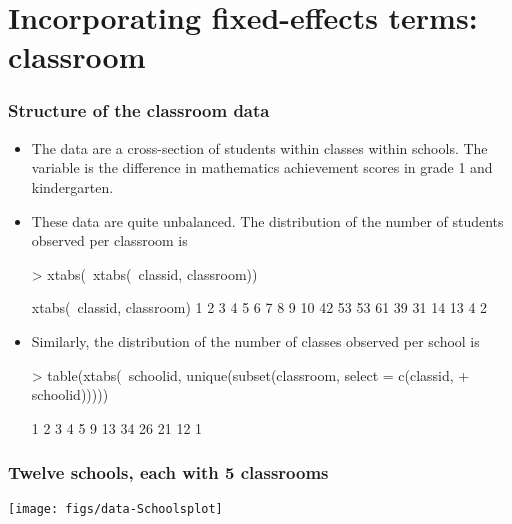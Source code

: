 \section[Fixed-effects]{Incorporating fixed-effects terms: classroom}

\begin{frame}[fragile]
  \frametitle{Structure of the classroom data}
  \begin{itemize}
  \item The  data are a cross-section of students
    within classes within schools.  The  variable is
    the difference in mathematics achievement scores in grade 1 and
    kindergarten.
  \item These data are quite unbalanced.  The distribution of the
    number of students observed per classroom is
\begin{Schunk}
\begin{Sinput}
> xtabs(~xtabs(~classid, classroom))
\end{Sinput}
\begin{Soutput}
xtabs(~classid, classroom)
 1  2  3  4  5  6  7  8  9 10 
42 53 53 61 39 31 14 13  4  2 
\end{Soutput}
\end{Schunk}
\item Similarly, the distribution of the number of classes observed
  per school is
\begin{Schunk}
\begin{Sinput}
> table(xtabs(~schoolid, unique(subset(classroom, select = c(classid, 
+     schoolid)))))
\end{Sinput}
\begin{Soutput}
 1  2  3  4  5  9 
13 34 26 21 12  1 
\end{Soutput}
\end{Schunk}
  \end{itemize}
\end{frame}

\begin{frame}[fragile]
  \frametitle{Twelve schools, each with 5 classrooms}
\texttt{[image: figs/data-Schoolsplot]}
\end{frame}

